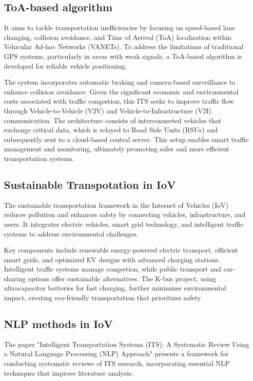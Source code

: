 \documentclass[12pt,twocolumn]{article}
\begin{document}
\subsection{ToA-based algorithm}

It aims to tackle transportation inefficiencies by focusing on speed-based lane changing, collision avoidance, and Time of Arrival (ToA) localization within Vehicular Ad-hoc Networks (VANETs). To address the limitations of traditional GPS systems, particularly in areas with weak signals, a ToA-based algorithm is developed for reliable vehicle positioning.

The system incorporates automatic braking and camera-based surveillance to enhance collision avoidance. Given the significant economic and environmental costs associated with traffic congestion, this ITS seeks to improve traffic flow through Vehicle-to-Vehicle (V2V) and Vehicle-to-Infrastructure (V2I) communication. The architecture consists of interconnected vehicles that exchange critical data, which is relayed to Road Side Units (RSUs) and subsequently sent to a cloud-based central server. This setup enables smart traffic management and monitoring, ultimately promoting safer and more efficient transportation systems.

\subsection{Sustainable Transpotation in IoV}
The sustainable transportation framework in the Internet of Vehicles (IoV) reduces pollution and enhances safety by connecting vehicles, infrastructure, and users. It integrates electric vehicles, smart grid technology, and intelligent traffic systems to address environmental challenges.

Key components include renewable energy-powered electric transport, efficient smart grids, and optimized EV designs with advanced charging stations. Intelligent traffic systems manage congestion, while public transport and car-sharing options offer sustainable alternatives. The K-bus project, using ultracapacitor batteries for fast charging, further minimizes environmental impact, creating eco-friendly transportation that prioritizes safety
\subsection{NLP methods in IoV}

The paper "Intelligent Transportation Systems (ITS): A Systematic Review Using a Natural Language Processing (NLP) Approach" presents a framework for conducting systematic reviews of ITS research, incorporating essential NLP techniques that improve literature analysis.
\end{document}
